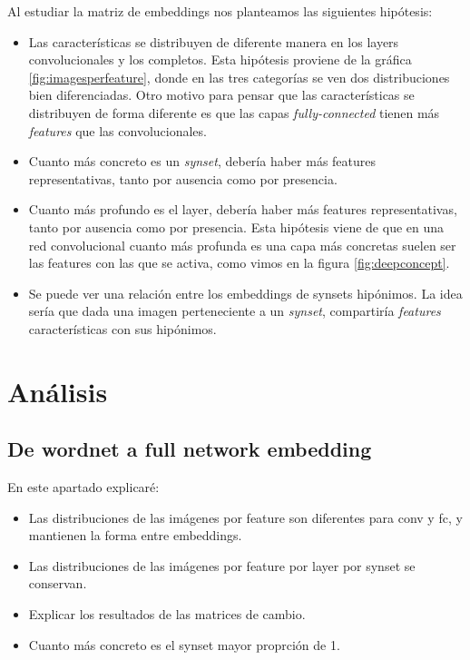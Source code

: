 \documentclass[12,twoside]{TFG-GM}
\theoremstyle{definition}
\theoremstyle{remark}
\begin{document}
Al estudiar la matriz de embeddings nos planteamos las siguientes hipótesis: 
\begin{itemize}
\item Las características se distribuyen de diferente manera en los layers convolucionales y los completos. Esta hipótesis proviene de la gráfica \ref{fig:imagesperfeature}, donde 
en las tres categorías se ven dos distribuciones bien diferenciadas. Otro motivo para pensar que las características se distribuyen de forma diferente es que las capas \textit{fully-connected} tienen más \textit{features} que las convolucionales.
\item Cuanto más concreto es un \textit{synset}, debería haber más features representativas, tanto por ausencia como por presencia.
\item Cuanto más profundo es el layer, debería haber más features representativas, tanto por ausencia como por presencia. Esta hipótesis viene de que en una red convolucional cuanto más profunda es una capa más concretas suelen ser las features con las que se activa, como vimos en la figura \ref{fig:deepconcept}.
\item Se puede ver una relación entre los embeddings de synsets hipónimos. La idea sería que dada una imagen perteneciente a un \textit{synset}, compartiría \textit{features} características con sus hipónimos.
\end{itemize}



\newpage
\section{Análisis}
\subsection{De wordnet a full network embedding}
En este apartado explicaré: 

\begin{itemize}
\item Las distribuciones de las imágenes por feature son diferentes para conv y fc, y mantienen la forma entre embeddings.
\item Las distribuciones de las imágenes por feature por layer por synset se conservan. 
\item Explicar los resultados de las matrices de cambio. 
\item Cuanto más concreto es el synset mayor proprción de 1. 

\end{itemize}
\end{document}
